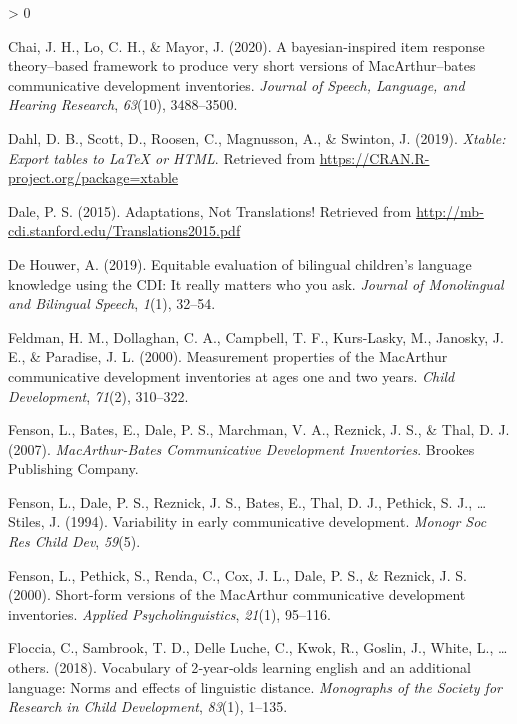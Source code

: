 \documentclass[
  english,
  ,man,floatsintext]{apa6}
\newlength{\cslhangindent}
\newenvironment{CSLReferences}[2] %
 {%
  \setlength{\parindent}{0pt}
  \ifodd #1 \everypar{\setlength{\hangindent}{\cslhangindent}}\ignorespaces\fi
  \ifnum #2 > 0
  \setlength{\parskip}{#2\baselineskip}
  \fi
 }%
 {}
\begin{document}
\begin{CSLReferences}{1}{0}
\leavevmode\hypertarget{ref-Chai2020}{}%
Chai, J. H., Lo, C. H., \& Mayor, J. (2020). A bayesian-inspired item response theory--based framework to produce very short versions of MacArthur--bates communicative development inventories. \emph{Journal of Speech, Language, and Hearing Research}, \emph{63}(10), 3488--3500.

\leavevmode\hypertarget{ref-R-xtable}{}%
Dahl, D. B., Scott, D., Roosen, C., Magnusson, A., \& Swinton, J. (2019). \emph{Xtable: Export tables to LaTeX or HTML}. Retrieved from \url{https://CRAN.R-project.org/package=xtable}

\leavevmode\hypertarget{ref-dale2015}{}%
Dale, P. S. (2015). {Adaptations, Not Translations!} Retrieved from \url{http://mb-cdi.stanford.edu/Translations2015.pdf}

\leavevmode\hypertarget{ref-DeHouwer2019}{}%
De Houwer, A. (2019). Equitable evaluation of bilingual children's language knowledge using the CDI: It really matters who you ask. \emph{Journal of Monolingual and Bilingual Speech}, \emph{1}(1), 32--54.

\leavevmode\hypertarget{ref-feldman2000}{}%
Feldman, H. M., Dollaghan, C. A., Campbell, T. F., Kurs-Lasky, M., Janosky, J. E., \& Paradise, J. L. (2000). Measurement properties of the MacArthur communicative development inventories at ages one and two years. \emph{Child Development}, \emph{71}(2), 310--322.

\leavevmode\hypertarget{ref-fenson2007}{}%
Fenson, L., Bates, E., Dale, P. S., Marchman, V. A., Reznick, J. S., \& Thal, D. J. (2007). \emph{Mac{A}rthur-{B}ates {C}ommunicative {D}evelopment {I}nventories}. Brookes Publishing Company.

\leavevmode\hypertarget{ref-fenson1994}{}%
Fenson, L., Dale, P. S., Reznick, J. S., Bates, E., Thal, D. J., Pethick, S. J., \ldots{} Stiles, J. (1994). Variability in early communicative development. \emph{Monogr Soc Res Child Dev}, \emph{59}(5).

\leavevmode\hypertarget{ref-fenson2000b}{}%
Fenson, L., Pethick, S., Renda, C., Cox, J. L., Dale, P. S., \& Reznick, J. S. (2000). Short-form versions of the MacArthur communicative development inventories. \emph{Applied Psycholinguistics}, \emph{21}(1), 95--116.

\leavevmode\hypertarget{ref-floccia2018}{}%
Floccia, C., Sambrook, T. D., Delle Luche, C., Kwok, R., Goslin, J., White, L., \ldots{} others. (2018). Vocabulary of 2‐year‐olds learning english and an additional language: Norms and effects of linguistic distance. \emph{Monographs of the Society for Research in Child Development}, \emph{83}(1), 1--135.


\end{CSLReferences}
\end{document}
